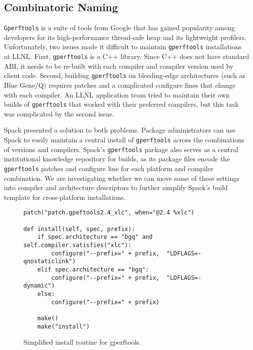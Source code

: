 
\subsection{Combinatoric Naming}
\label{sec:usecase-combinatoric}

{\tt Gperftools} is a suite of tools from Google that has gained popularity among
developers for its high-performance thread-safe heap and its lightweight profilers.
Unfortunately, two issues made it difficult to maintain {\tt gperftools} installations
at LLNL.  First, {\tt gperftools} is a C++ library.  Since C++ does not have standard
ABI, it needs to be re-built with each compiler and compiler version used by client
code.  Second, building {\tt gperftools} on bleeding-edge architectures
(such as Blue Gene/Q) requires patches and a complicated configure lines that
change with each compiler.  An LLNL application team tried to maintain their own
builds of {\tt gperftools} that worked with their preferred compilers, but this
task was complicated by the second issue.

Spack presented a solution to both problems.  Package administrators can use Spack to
easily maintain a central install of {\tt gperftools} across the combinations of
versions and compilers.  Spack's {\tt gperftools} package also serves as a central
institutional knowledge repository for builds, as its package files encode
the {\tt gperftools} patches and configure line for each platform and compiler combination.
We are investigating whether we can move some of these settings into compiler and
architecture descriptors to further simplify Spack's build template for cross-platform
installations.
\begin{figure}
\begin{verbatim}
patch("patch.gpeftools2.4_xlc", when="@2.4 %xlc")

def install(self, spec, prefix):
    if spec.architecture == "bgq" and self.compiler.satisfies("xlc"):
        configure("--prefix=" + prefix,  "LDFLAGS=-qnostaticlink")
    elif spec.architecture == "bgq":
        configure("--prefix=" + prefix,  "LDFLAGS=-dynamic")
    else:
        configure("--prefix=" + prefix)

    make()
    make("install")
\end{verbatim}
  \caption{
    Simplified install routine for gperftools.
    \label{fig:gperftools}
  }
\end{figure}

